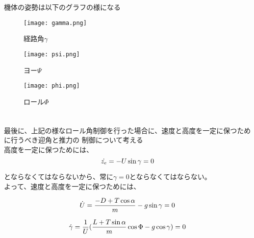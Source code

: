 \documentclass[15pt,uplatex,dvipdfmx]{jsarticle}
\begin{document}
機体の姿勢は以下のグラフの様になる \\

\begin{figure}[H]
\begin{center}
  \texttt{[image: gamma.png]}
\end{center}
  \caption{経路角$\gamma$}
\end{figure}

\begin{figure}[H]
\begin{center}
  \texttt{[image: psi.png]}
\end{center}
  \caption{ヨー$\Psi$}
\end{figure}

\begin{figure}[H]
\begin{center}
  \texttt{[image: phi.png]}
\end{center}
  \caption{ロール$\Phi$}
\end{figure}


\section{}
最後に、上記の様なロール角制御を行った場合に、速度と高度を一定に保つために行うべき迎角と推力の
制御について考える \\
高度を一定に保つためには、\\
\begin{equation}
    \dot{z_e} = -U \sin{\gamma} =0 \\
\end{equation}

とならなくてはならないから、常に$\gamma=0$とならなくてはならない。\\
よって、速度と高度を一定に保つためには、

\begin{equation}
    \dot{U} = \frac{-D + T\cos{\alpha}}{m} - g\sin{\gamma} =0 \\
\end{equation}

\begin{equation}
    \dot{\gamma} = \frac{1}{U}(\frac{L+T\sin{\alpha}}{m}\cos{\Phi}-g\cos{\gamma}) = 0 \\
\end{equation}
\end{document}
